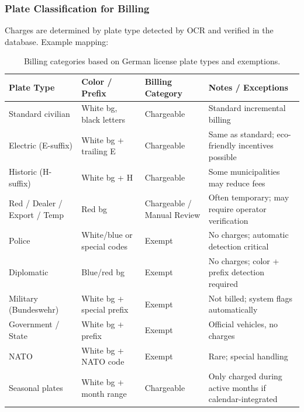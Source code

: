 	\subsubsection{Plate Classification for Billing}
	Charges are determined by plate type detected by OCR and verified in the database. Example mapping:
	
	\begin{table}[h!]
		\centering
		\begin{tabular}{|p{3.5cm}|p{3.5cm}|p{3.5cm}|p{3.5cm}|}
			\hline
			\textbf{Plate Type} & \textbf{Color / Prefix} & \textbf{Billing Category} & \textbf{Notes / Exceptions} \\
			\hline
			Standard civilian & White bg, black letters & Chargeable & Standard incremental billing \\
			\hline
			Electric (E-suffix) & White bg + trailing E & Chargeable & Same as standard; eco-friendly incentives possible \\
			\hline
			Historic (H-suffix) & White bg + H & Chargeable & Some municipalities may reduce fees \\
			\hline
			Red / Dealer / Export / Temp & Red bg & Chargeable / Manual Review & Often temporary; may require operator verification \\
			\hline
			Police & White/blue or special codes & Exempt & No charges; automatic detection critical \\
			\hline
			Diplomatic & Blue/red bg & Exempt & No charges; color + prefix detection required \\
			\hline
			Military (Bundeswehr) & White bg + special prefix & Exempt & Not billed; system flags automatically \\
			\hline
			Government / State & White bg + prefix & Exempt & Official vehicles, no charges \\
			\hline
			NATO & White bg + NATO code & Exempt & Rare; special handling \\
			\hline
			Seasonal plates & White bg + month range & Chargeable & Only charged during active months if calendar-integrated \\
			\hline
		\end{tabular}
		\caption{Billing categories based on German license plate types and exemptions.}
		\label{tab:billing_categories}
	\end{table}
	
